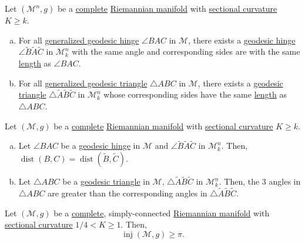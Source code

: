 \begin{lemma}
	Let \((\mathcal{M}^n , g)\) be a \hyperref[def:geodesically-complete]{complete} \hyperref[def:Riemannian-manifold]{Riemannian manifold} with \hyperref[def:sectional-curvature]{sectional curvature} \(K \geq k\).
	\begin{enumerate}[(a)]
		\item For all \hyperref[def:generalized-geodesic-hinge]{generalized geodesic hinge} \(\angle BAC\) in \(\mathcal{M} \), there exists a \hyperref[def:geodesic-hinge]{geodesic hinge} \(\angle \widetilde{B} \widetilde{A} \widetilde{C} \) in \(\mathcal{M} ^n_k\) with the same angle and corresponding sides are with the same \hyperref[def:length]{length} as \(\angle BAC\).
		\item For all \hyperref[def:generalized-geodesic-triangle]{generalized geodesic triangle} \(\triangle ABC\) in \(\mathcal{M} \), there exists a \hyperref[def:geodesic-triangle]{geodesic triangle} \(\triangle \widetilde{A} \widetilde{B} \widetilde{C} \) in \(\mathcal{M} ^n_k\) whose corresponding sides have the same \hyperref[def:length]{length} as \(\triangle ABC\).
	\end{enumerate}
\end{lemma}

\begin{theorem}\label{thm:Toponogor}
	Let \((\mathcal{M} , g)\) be a \hyperref[def:geodesically-complete]{complete} \hyperref[def:Riemannian-manifold]{Riemannian manifold} with \hyperref[def:sectional-curvature]{sectional curvature} \(K \geq k\).
	\begin{enumerate}[(a)]
		\item Let \(\angle BAC\) be a \hyperref[def:geodesic-hinge]{geodesic hinge} in \(\mathcal{M} \) and \(\angle \widetilde{B} \widetilde{A} \widetilde{C} \) in \(\mathcal{M} _k^n\). Then, \(\mathop{\mathrm{dist}}(B, C) = \mathop{\mathrm{dist}}(\widetilde{B} , \widetilde{C} ) \).
		\item Let \(\triangle ABC\) be a \hyperref[def:geodesic-triangle]{geodesic triangle} in \(\mathcal{M} \), \(\triangle \widetilde{A} \widetilde{B} \widetilde{C} \) in \(\mathcal{M} _k^n\). Then, the \(3\) angles in \(\triangle ABC\) are greater than the corresponding angles in \(\triangle \widetilde{A} \widetilde{B} \widetilde{C} \).
	\end{enumerate}
\end{theorem}

\begin{theorem}[Klingenberg]\label{thm:Klingenberg}
	Let \((\mathcal{M} , g)\) be a \hyperref[def:geodesically-complete]{complete}, simply-connected \hyperref[def:Riemannian-manifold]{Riemannian manifold} with \hyperref[def:sectional-curvature]{sectional curvature} \(1 / 4 < K \geq 1\). Then,
	\[
		\mathop{\mathrm{inj}}(\mathcal{M} , g) \geq \pi .
	\]
\end{theorem}

